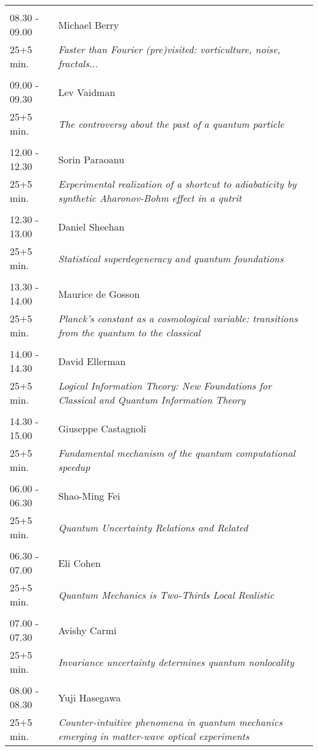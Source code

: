 \begin{longtable}{p{3cm}p{13cm}}
 & \\ 
08.30 - 09.00 & Michael Berry\\ 
25+5 min. & {\it Faster than Fourier (pre)visited: vorticulture, noise, fractals...}\\ 
 & \\ 
09.00 - 09.30 & Lev Vaidman\\ 
25+5 min. & {\it The controversy about the past of a quantum particle}\\ 
 & \\ 
12.00 - 12.30 & Sorin Paraoanu\\ 
25+5 min. & {\it Experimental realization of a shortcut to adiabaticity by synthetic Aharonov-Bohm effect in a qutrit}\\ 
 & \\ 
12.30 - 13.00 & Daniel Sheehan\\ 
25+5 min. & {\it Statistical superdegeneracy and quantum foundations}\\ 
 & \\ 
13.30 - 14.00 & Maurice de Gosson\\ 
25+5 min. & {\it Planck's constant as a cosmological variable: transitions from the quantum to the classical}\\ 
 & \\ 
14.00 - 14.30 & David Ellerman\\ 
25+5 min. & {\it Logical Information Theory: New Foundations for Classical and Quantum Information Theory}\\ 
 & \\ 
14.30 - 15.00 & Giuseppe Castagnoli\\ 
25+5 min. & {\it Fundamental mechanism of the quantum computational speedup}\\ 
 & \\ 
06.00 - 06.30 & Shao-Ming Fei\\ 
25+5 min. & {\it Quantum Uncertainty Relations and Related}\\ 
 & \\ 
06.30 - 07.00 & Eli Cohen\\ 
25+5 min. & {\it Quantum Mechanics is Two-Thirds Local Realistic}\\ 
 & \\ 
07.00 - 07.30 & Avishy Carmi\\ 
25+5 min. & {\it Invariance uncertainty determines quantum nonlocality}\\ 
 & \\ 
08.00 - 08.30 & Yuji Hasegawa\\ 
25+5 min. & {\it Counter-intuitive phenomena in quantum mechanics  emerging in matter-wave optical experiments}\\ 

\end{longtable}
